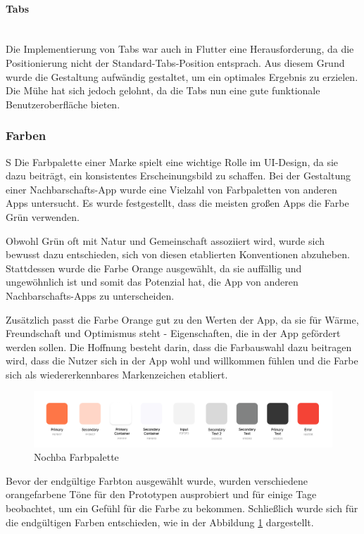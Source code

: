 \paragraph{Tabs}\mbox{} \\
Die Implementierung von Tabs war auch in Flutter eine
Herausforderung, da die Positionierung nicht der
Standard-Tabs-Position entsprach. Aus diesem Grund wurde die
Gestaltung aufwändig gestaltet, um ein optimales Ergebnis zu
erzielen. Die Mühe hat sich jedoch gelohnt, da die Tabs nun
eine gute funktionale Benutzeroberfläche bieten.

\subsubsection{Farben}S
Die Farbpalette einer Marke spielt eine wichtige Rolle im UI-Design, da sie dazu beiträgt, ein konsistentes Erscheinungsbild zu schaffen. Bei der Gestaltung einer Nachbarschafts-App wurde eine Vielzahl von Farbpaletten von anderen Apps untersucht. Es wurde festgestellt, dass die meisten großen Apps die Farbe Grün verwenden.

Obwohl Grün oft mit Natur und Gemeinschaft assoziiert wird, wurde sich bewusst dazu entschieden, sich von diesen etablierten Konventionen abzuheben. Stattdessen wurde die Farbe Orange ausgewählt, da sie auffällig und ungewöhnlich ist und somit das Potenzial hat, die App von anderen Nachbarschafts-Apps zu unterscheiden.

Zusätzlich passt die Farbe Orange gut zu den Werten der App, da sie für Wärme, Freundschaft und Optimismus steht - Eigenschaften, die in der App gefördert werden sollen. Die Hoffnung besteht darin, dass die Farbauswahl dazu beitragen wird, dass die Nutzer sich in der App wohl und willkommen fühlen und die Farbe sich als wiedererkennbares Markenzeichen etabliert.


\begin{figure}[h]
  \centering
  \includegraphics[width=1\textwidth]{pics/colors.png}
  \caption{Nochba Farbpalette}
  \label{fig:color-chart}
\end{figure}

Bevor der endgültige Farbton ausgewählt wurde, wurden verschiedene orangefarbene Töne für den Prototypen ausprobiert und für einige Tage beobachtet, um ein Gefühl für die Farbe zu bekommen. Schließlich wurde sich für die endgültigen Farben entschieden, wie in der Abbildung \ref{fig:color-chart} dargestellt.

